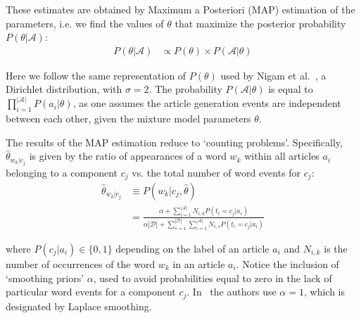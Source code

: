 These estimates 
are obtained by Maximum a Posteriori (MAP) estimation of the parameters, i.e. 
we find the values of $\theta$ that maximize the posterior probability 
$P(\theta|\mathcal{A})$: 
\begin{equation}
\begin{split}
    P(\theta|\mathcal{A}) &\propto P(\theta) \times P(\mathcal{A}|\theta)
    \label{eq:posterior-map}
\end{split}
\end{equation}

Here we follow the same representation of $P(\theta)$ used by 
Nigam et al.~\cite{Nigam2000}, a Dirichlet distribution, with $\sigma = 2$. 
The probability $P(\mathcal{A}|\theta)$ is equal to 
$\prod_{i=1}^{|\mathcal{A}|}P(a_i|\theta)$, as one assumes the article 
generation events are independent between each other, given the mixture model 
parameters $\theta$.\vertbreak

The results of the MAP 
estimation reduce to `counting problems'. 
Specifically, $\hat{\theta}_{w_k|c_j}$ is given by the ratio of appearances of 
a word $w_k$ within all articles $a_i$ belonging to a component $c_j$ vs. the 
total number of word events for $c_j$:
\begin{equation}
\begin{split}
    \hat{\theta}_{w_k|c_j} &\equiv P(w_k|c_j,\hat{\theta})\\
    &= \frac{\alpha + \sum_{i=1}^{|\mathcal{A}|}N_{i,k}P(t_i = c_j|a_i)}{\alpha|\mathcal{D}| + \sum_{s=1}^{|\mathcal{D}|}\sum_{i=1}^{|\mathcal{A}|}N_{i,s}P(t_i = c_j|a_i)}
    \label{eq:class-cond-estimate}
\end{split}
\end{equation}

where $P(c_j|a_i) \in \{0,1\}$ depending on the label of an article $a_i$
and $N_{i,k}$ is the number of occurrences of the word $w_k$ in an article 
$a_i$. Notice the inclusion of `smoothing priors' $\alpha$, used to avoid 
probabilities equal to zero in the lack of particular word events for a 
component $c_j$. In~\cite{McCallum98acomparison,Nigam2000} the authors use 
$\alpha = 1$, which is designated by Laplace smoothing.\vertbreak

